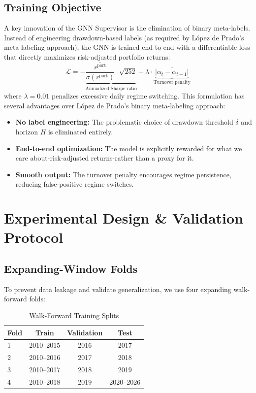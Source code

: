 \documentclass[conferences]{IEEEtran}
\begin{document}
\subsection{Training Objective}
A key innovation of the GNN Supervisor is the elimination of binary meta-labels. Instead of engineering drawdown-based labels (as required by López de Prado's meta-labeling approach), the GNN is trained end-to-end with a differentiable loss that directly maximizes risk-adjusted portfolio returns:
\[
    \mathcal{L} = -\underbrace{\frac{\overline{r^{\text{port}}}}{\sigma(r^{\text{port}})} \cdot \sqrt{252}}_{\text{Annualized Sharpe ratio}} + \lambda \cdot \underbrace{\overline{|\alpha_t - \alpha_{t-1}|}}_{\text{Turnover penalty}}
\]
where $\lambda = 0.01$ penalizes excessive daily regime switching. This formulation has several advantages over López de Prado's binary meta-labeling approach:
\begin{itemize}
    \item \textbf{No label engineering:} The problematic choice of drawdown threshold $\delta$ and horizon $H$ is eliminated entirely.
    \item \textbf{End-to-end optimization:} The model is explicitly rewarded for what we care about-risk-adjusted returns-rather than a proxy for it.
    \item \textbf{Smooth output:} The turnover penalty encourages regime persistence, reducing false-positive regime switches.
\end{itemize}


\section{Experimental Design \& Validation Protocol}

\subsection{Expanding-Window Folds}
To prevent data leakage and validate generalization, we use four expanding walk-forward folds:

\begin{table}[h]
\centering
\caption{Walk-Forward Training Splits}
\begin{tabular}{lccc}
\toprule
\textbf{Fold} & \textbf{Train} & \textbf{Validation} & \textbf{Test} \\
\midrule
1 & 2010--2015 & 2016 & 2017 \\
2 & 2010--2016 & 2017 & 2018 \\
3 & 2010--2017 & 2018 & 2019 \\
4 & 2010--2018 & 2019 & 2020--2026 \\
\bottomrule
\end{tabular}
\end{table}
\end{document}

